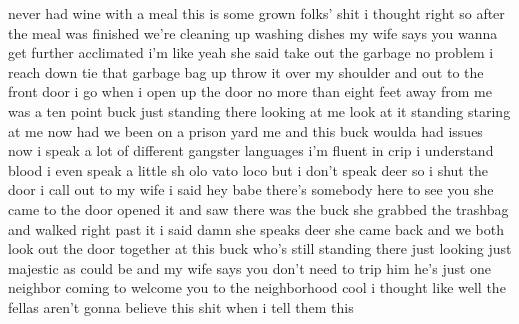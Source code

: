 never had wine with a meal this is some grown folks' shit i thought right so after the meal was finished we're cleaning up washing dishes my wife says you wanna get further acclimated i'm like yeah she said take out the garbage no problem i reach down tie that garbage bag up throw it over my shoulder and out to the front door i go when i open up the door no more than eight feet away from me was a ten point buck just standing there looking at me look at it standing staring at me now had we been on a prison yard me and this buck woulda had issues now i speak a lot of different gangster languages i'm fluent in crip i understand blood i even speak a little sh olo vato loco but i don't speak deer so i shut the door i call out to my wife i said hey babe there's somebody here to see you she came to the door opened it and saw there was the buck she grabbed the trashbag and walked right past it i said damn she speaks deer she came back and we both look out the door together at this buck who's still standing there just looking just majestic as could be and my wife says you don't need to trip him he's just one neighbor coming to welcome you to the neighborhood cool i thought like well the fellas aren't gonna believe this shit when i tell them this